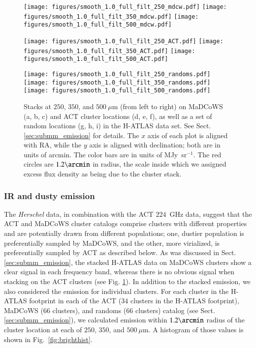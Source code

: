 \documentclass[longauth]{aa} %
\newcommand{\micron}{\mbox{{$\mu$}m}\xspace}
\begin{document}
\begin{figure*}
\centering
\texttt{[image: figures/smooth\_1.0\_full\_filt\_250\_mdcw.pdf]}
\texttt{[image: figures/smooth\_1.0\_full\_filt\_350\_mdcw.pdf]}
\texttt{[image: figures/smooth\_1.0\_full\_filt\_500\_mdcw.pdf]}

\texttt{[image: figures/smooth\_1.0\_full\_filt\_250\_ACT.pdf]}
\texttt{[image: figures/smooth\_1.0\_full\_filt\_350\_ACT.pdf]}
\texttt{[image: figures/smooth\_1.0\_full\_filt\_500\_ACT.pdf]}

\texttt{[image: figures/smooth\_1.0\_full\_filt\_250\_randoms.pdf]}
\texttt{[image: figures/smooth\_1.0\_full\_filt\_350\_randoms.pdf]}
\texttt{[image: figures/smooth\_1.0\_full\_filt\_500\_randoms.pdf]}
\caption{Stacks at $250$, $350$, and $500~\micron$ (from left to right) on MaDCoWS (a, b, c) and ACT cluster locations (d, e, f), as well as a set of random locations (g, h, i) in the H-ATLAS data set. See Sect. \ref{sec:submm_emission} for details. The $x$ axis of each plot is aligned with RA, while the $y$ axis is aligned with declination; both are in units of arcmin. The color bars are in units of MJy~sr$^{-1}$. The red circles are $1.2\arcmin$ in radius, the scale inside which we assigned excess flux density as being due to the cluster stack.}
\label{fig:stackedHerschel}
\end{figure*}

\subsubsection{IR and dusty emission}\label{sec:ir_disc}


The {\it Herschel} data, in combination with the ACT $224$~GHz data, suggest that the ACT and MaDCoWS cluster catalogs comprise clusters with different properties and are potentially drawn from different populations; one, dustier population is preferentially sampled by MaDCoWS, and the other, more virialized, is preferentially sampled by ACT as described below. As was discussed in Sect. \ref{sec:submm_emission}, the stacked H-ATLAS data on MaDCoWS clusters show a clear signal in each frequency band, whereas there is no obvious signal when stacking on the ACT clusters (see Fig. \ref{fig:stackedHerschel}). In addition to the stacked emission, we also considered the emission for individual clusters. For each cluster in the H-ATLAS footprint in each of the ACT ($34$ clusters in the H-ATLAS footprint), MaDCoWS ($66$ clusters), and randoms ($66$ clusters) catalog (see Sect. \ref{sec:submm_emission}), we calculated emission within $1.2\arcmin$ radius of the cluster location at each of $250$, $350$, and $500~\mu$m. A histogram of those values is shown in Fig.~\ref{fig:brighthist}.
\end{document}
